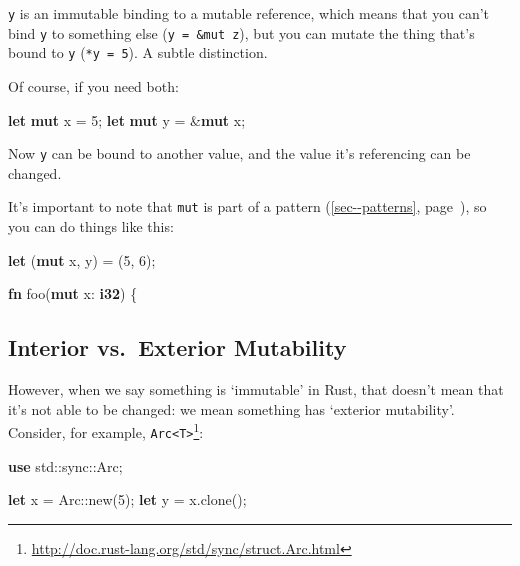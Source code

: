 \documentclass[a4paper,]{book}
\renewcommand*{\hyperref}[2][\ar]{%
  \def\ar{#2}%
  #2 (\autoref{#1}, page~\pageref{#1})}
\newenvironment{Shaded}{\begin{snugshade}}{\end{snugshade}}
\newcommand{\KeywordTok}[1]{\textcolor[rgb]{0.13,0.29,0.53}{\textbf{{#1}}}}
\newcommand{\DecValTok}[1]{\textcolor[rgb]{0.00,0.00,0.81}{{#1}}}
\newcommand{\NormalTok}[1]{{#1}}
\renewcommand{\href}[2]{#2\footnote{\url{#1}}}
\begin{document}
\texttt{y} is an immutable binding to a mutable reference, which means
that you can't bind \texttt{y} to something else
(\texttt{y\ =\ \&mut\ z}), but you can mutate the thing that's bound to
\texttt{y} (\texttt{*y\ =\ 5}). A subtle distinction.

Of course, if you need both:

\begin{Shaded}
\begin{Highlighting}[]
\KeywordTok{let} \KeywordTok{mut} \NormalTok{x = }\DecValTok{5}\NormalTok{;}
\KeywordTok{let} \KeywordTok{mut} \NormalTok{y = &}\KeywordTok{mut} \NormalTok{x;}
\end{Highlighting}
\end{Shaded}

Now \texttt{y} can be bound to another value, and the value it's
referencing can be changed.

It's important to note that \texttt{mut} is part of a
\hyperref[sec--patterns]{pattern}, so you can do things like this:

\begin{Shaded}
\begin{Highlighting}[]
\KeywordTok{let} \NormalTok{(}\KeywordTok{mut} \NormalTok{x, y) = (}\DecValTok{5}\NormalTok{, }\DecValTok{6}\NormalTok{);}

\KeywordTok{fn} \NormalTok{foo(}\KeywordTok{mut} \NormalTok{x: }\KeywordTok{i32}\NormalTok{) \{}
\end{Highlighting}
\end{Shaded}

\subsection{Interior vs.~Exterior
Mutability}\label{interior-vs.exterior-mutability}

However, when we say something is `immutable' in Rust, that doesn't mean
that it's not able to be changed: we mean something has `exterior
mutability'. Consider, for example,
\href{http://doc.rust-lang.org/std/sync/struct.Arc.html}{\texttt{Arc\textless{}T\textgreater{}}}:

\begin{Shaded}
\begin{Highlighting}[]
\KeywordTok{use} \NormalTok{std::sync::Arc;}

\KeywordTok{let} \NormalTok{x = Arc::new(}\DecValTok{5}\NormalTok{);}
\KeywordTok{let} \NormalTok{y = x.clone();}
\end{Highlighting}
\end{Shaded}
\end{document}
